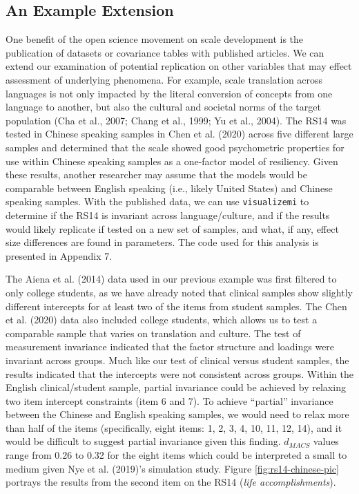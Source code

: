\documentclass[
  man]{apa7}
\begin{document}
\hypertarget{an-example-extension}{%
\subsection{An Example Extension}\label{an-example-extension}}

One benefit of the open science movement on scale development is the publication of datasets or covariance tables with published articles. We can extend our examination of potential replication on other variables that may effect assessment of underlying phenomena. For example, scale translation across languages is not only impacted by the literal conversion of concepts from one language to another, but also the cultural and societal norms of the target population (Cha et al., 2007; Chang et al., 1999; Yu et al., 2004). The RS14 was tested in Chinese speaking samples in Chen et al. (2020) across five different large samples and determined that the scale showed good psychometric properties for use within Chinese speaking samples as a one-factor model of resiliency. Given these results, another researcher may assume that the models would be comparable between English speaking (i.e., likely United States) and Chinese speaking samples. With the published data, we can use \texttt{visualizemi} to determine if the RS14 is invariant across language/culture, and if the results would likely replicate if tested on a new set of samples, and what, if any, effect size differences are found in parameters. The code used for this analysis is presented in Appendix 7.

The Aiena et al. (2014) data used in our previous example was first filtered to only college students, as we have already noted that clinical samples show slightly different intercepts for at least two of the items from student samples. The Chen et al. (2020) data also included college students, which allows us to test a comparable sample that varies on translation and culture. The test of measurement invariance indicated that the factor structure and loadings were invariant across groups. Much like our test of clinical versus student samples, the results indicated that the intercepts were not consistent across groups. Within the English clinical/student sample, partial invariance could be achieved by relaxing two item intercept constraints (item 6 and 7). To achieve ``partial'' invariance between the Chinese and English speaking samples, we would need to relax more than half of the items (specifically, eight items: 1, 2, 3, 4, 10, 11, 12, 14), and it would be difficult to suggest partial invariance given this finding. \(d_{MACS}\) values range from 0.26 to 0.32 for the eight items which could be interpreted a small to medium given Nye et al. (2019)'s simulation study. Figure \ref{fig:rs14-chinese-pic} portrays the results from the second item on the RS14 (\emph{life accomplishments}).
\end{document}
